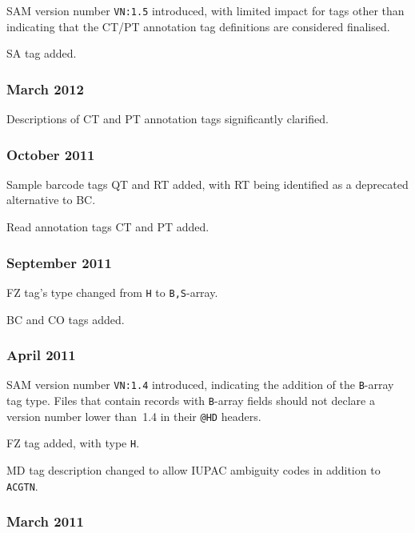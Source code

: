 \documentclass[10pt]{article}
\begin{document}
\begin{appendices}
SAM version number {\tt VN:1.5} introduced, with limited impact for tags other than indicating that the CT/PT annotation tag definitions are considered finalised.

\gap
SA tag added.

\subsubsection*{March 2012}

Descriptions of CT and PT annotation tags significantly clarified.

\subsubsection*{October 2011}

Sample barcode tags QT and RT added, with RT being identified as a deprecated alternative to BC.

Read annotation tags CT and PT added.

\subsubsection*{September 2011}

FZ tag's type changed from {\tt H} to {\tt B,S}-array.

BC and CO tags added.

\subsubsection*{April 2011}

SAM version number {\tt VN:1.4} introduced, indicating the addition of the {\tt B}-array tag type.
Files that contain records with {\tt B}-array fields should not declare a version number lower than~1.4 in their {\tt @HD} headers.

\gap
FZ tag added, with type {\tt H}.

MD tag description changed to allow IUPAC ambiguity codes in addition to {\tt ACGTN}.

\subsubsection*{March 2011}


\end{appendices}
\end{document}
